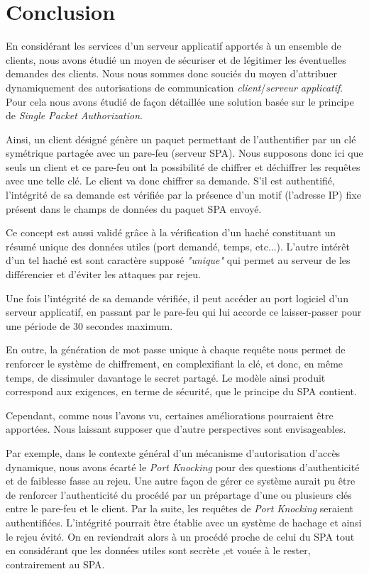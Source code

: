 \chapter*{Conclusion}
En considérant les services d'un serveur applicatif apportés à un ensemble de clients, nous avons étudié un moyen de sécuriser et de légitimer les éventuelles demandes des clients.
Nous nous sommes donc souciés du moyen d'attribuer dynamiquement des autorisations de communication \emph{client}/\emph{serveur applicatif}. Pour cela nous avons étudié de façon détaillée une solution basée sur le principe de \emph{Single Packet Authorization}.

Ainsi, un client désigné génère un paquet permettant de l'authentifier par un clé symétrique partagée avec un pare-feu (serveur SPA). Nous supposons donc ici que seuls un client et ce pare-feu ont la possibilité de chiffrer et déchiffrer les requêtes avec une telle clé. Le client va donc chiffrer sa demande. S'il est authentifié, l'intégrité de sa demande est vérifiée par la présence d'un motif (l'adresse IP) fixe présent dans le champs de données du paquet SPA envoyé.

Ce concept est aussi validé grâce à la vérification d'un haché constituant un résumé unique des données utiles (port demandé, temps, etc...). L'autre intérêt d'un tel haché est sont caractère supposé \emph{"unique"} qui permet au serveur de les différencier et d'éviter les attaques par rejeu.

Une fois l'intégrité de sa demande vérifiée, il peut accéder au port logiciel d'un serveur applicatif, en passant par le pare-feu qui lui accorde ce laisser-passer pour une période de 30 secondes maximum.

En outre, la génération de mot passe unique à chaque requête nous permet de renforcer le système de chiffrement, en complexifiant la clé, et donc, en même temps, de dissimuler davantage le secret partagé.
Le modèle ainsi produit correspond aux exigences, en terme de sécurité, que le principe du SPA contient.

Cependant, comme nous l'avons vu, certaines améliorations pourraient être apportées. Nous laissant supposer que d'autre perspectives sont envisageables.

Par exemple, dans le contexte général d'un mécanisme d'autorisation d'accès dynamique, nous avons écarté le \emph{Port Knocking} pour des questions d'authenticité et de faiblesse fasse au rejeu.
Une autre façon de gérer ce système aurait pu être de renforcer l'authenticité du procédé par un prépartage d'une ou plusieurs clés entre le pare-feu et le client. Par la suite, les requêtes de \emph{Port Knocking} seraient authentifiées. L'intégrité pourrait être établie avec un système de hachage et ainsi le rejeu évité.
On en reviendrait alors à un procédé proche de celui du SPA tout en considérant que les données utiles sont secrète ,et vouée à le rester, contrairement au SPA.

